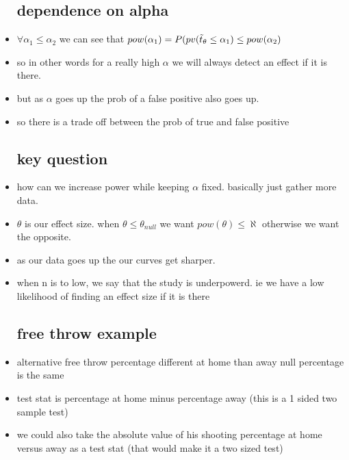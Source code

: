\documentclass{article}
\begin{document}
\begin{itemize}
\subsection{dependence on alpha}
\item $\forall \alpha_1\leq \alpha_2$ we can see that $pow(\alpha_1)=P(pv(\Tilde{t}_{\theta}\leq \alpha_1)\leq pow(\alpha_2)$
\item so in other words for a really high $\alpha$ we will always detect an effect if it is there. 
\item but as $\alpha$ goes up the prob of a false positive also goes up. 
\item so there is a trade off between the prob of true and false positive 
\subsection{key question}
\item how can we increase power while keeping $\alpha$ fixed. basically just gather more data. 
\item $\theta$ is our effect size. when $\theta\leq \theta_{null}$ we want $pow(\theta)\leq \aleph$ otherwise we want the opposite. 
\item as our data goes up the our curves get sharper. 
\item when n is to low, we say that the study is underpowerd. ie we have a low likelihood of finding an effect size if it is there 
\subsection{free throw example}
\item alternative free throw percentage different at home than away 
\itme null percentage is the same 
\item test stat is percentage at home minus percentage away (this is a 1 sided two sample test) 
\item we could also take the absolute value of his shooting percentage at home versus away as a test stat (that would make it a two sized test) 

\end{itemize}
\end{document}

